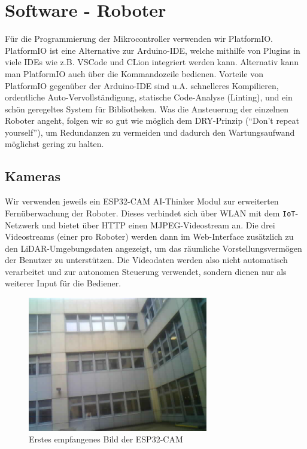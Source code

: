 
\section{Software - Roboter}
\label{sec:software_robots}
Für die Programmierung der Mikrocontroller verwenden wir PlatformIO.
%
PlatformIO ist eine Alternative zur Arduino-IDE,
welche mithilfe von Plugins in viele IDEs wie z.B. VSCode und CLion integriert werden kann.
%
Alternativ kann man PlatformIO auch über die Kommandozeile bedienen.
%
Vorteile von PlatformIO gegenüber der Arduino-IDE sind u.A. schnelleres Kompilieren,
ordentliche Auto-Vervollständigung,
statische Code-Analyse (Linting),
und ein schön geregeltes System für Bibliotheken.
%
Was die Ansteuerung der einzelnen Roboter angeht, folgen wir so gut wie möglich dem DRY-Prinzip (``Don't repeat yourself''),
um Redundanzen zu vermeiden und dadurch den Wartungsaufwand möglichst gering zu halten.

\subsection{Kameras}
\label{subsec:robots_cams}
Wir verwenden jeweils ein ESP32-CAM AI-Thinker Modul zur erweiterten
Fernüberwachung der Roboter.
%
Dieses verbindet sich über WLAN mit dem \texttt{IoT}-Netzwerk und bietet über HTTP einen MJPEG-Videostream an.
%
Die drei Videostreams (einer pro Roboter) werden dann im Web-Interface
zusätzlich zu den LiDAR-Umgebungsdaten angezeigt,
um das räumliche Vorstellungsvermögen der Benutzer zu unterstützen.
%
Die Videodaten werden also nicht automatisch verarbeitet und zur autonomen Steuerung verwendet,
sondern dienen nur als weiterer Input für die Bediener.
\begin{figure}[H]
    \includegraphics[width=0.7\textwidth, center]{img/cam_erstes_bild.png}
    \caption{Erstes empfangenes Bild der ESP32-CAM}
    \label{fig:cam_erstes_bild}
\end{figure}

